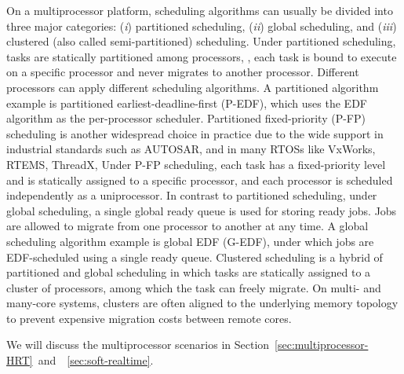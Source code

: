 
On a multiprocessor platform, scheduling algorithms can usually be divided into three major categories: (\textit{i}) partitioned scheduling, (\textit{ii}) global scheduling, and (\textit{iii}) clustered (also called semi-partitioned) scheduling. 
Under partitioned scheduling, tasks are statically partitioned among processors, \ie, each task is bound to execute on a specific processor and never migrates to another processor. Different processors can apply different scheduling algorithms. A partitioned algorithm example is partitioned earliest-deadline-first (P-EDF), which uses the EDF algorithm as the per-processor scheduler. 
Partitioned fixed-priority (P-FP) scheduling is another widespread
choice in practice due to the wide support in industrial standards
such as AUTOSAR, and in many RTOSs like VxWorks, RTEMS, ThreadX, \etc
Under P-FP scheduling, each task has a fixed-priority level and is statically assigned to a specific processor, and each processor is scheduled independently as a uniprocessor.  
 In contrast to partitioned scheduling, under global scheduling, a single global ready queue is used for storing ready jobs.  Jobs are allowed to migrate from one processor to another at any time. A global scheduling algorithm example is global EDF (G-EDF), under which jobs are EDF-scheduled using a single ready queue.  
 Clustered scheduling is a hybrid of partitioned and global scheduling in which tasks are statically assigned to a cluster of processors, among which the task can freely migrate. On multi- and many-core systems, clusters are often aligned to the underlying memory topology to prevent expensive migration costs between remote cores. %

We will discuss the multiprocessor scenarios in Section~\ref{sec:multiprocessor-HRT}~and~\mysectionref{}~\ref{sec:soft-realtime}.



  
  
  
